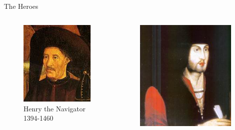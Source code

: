 \documentclass{beamer}
\begin{document}
\begin{frame}{The Heroes}

\begin{columns}
	\begin{figure}[ht]
	\begin{center}
	\includegraphics[width=0.9 \columnwidth]{Henry.jpg}
	\caption{\tiny Henry the Navigator 1394-1460}	 %
	\end{center}
	\end{figure}
	\begin{figure}[ht]
	\begin{center}
	\includegraphics[width=0.9 \columnwidth]{JohnII.jpg}

\end{center}
\end{figure}
\end{columns}
\end{frame}
\end{document}
